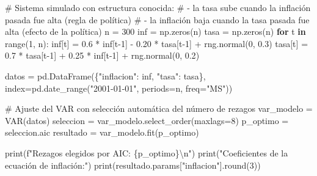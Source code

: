 \documentclass[
  spanish,
  letterpaper,
  DIV=11,
  numbers=noendperiod]{scrreprt}
\newenvironment{Shaded}{\begin{snugshade}}{\end{snugshade}}
\newcommand{\BuiltInTok}[1]{\textcolor[rgb]{0.00,0.23,0.31}{#1}}
\newcommand{\CharTok}[1]{\textcolor[rgb]{0.13,0.47,0.30}{#1}}
\newcommand{\CommentTok}[1]{\textcolor[rgb]{0.37,0.37,0.37}{#1}}
\newcommand{\ControlFlowTok}[1]{\textcolor[rgb]{0.00,0.23,0.31}{\textbf{#1}}}
\newcommand{\DecValTok}[1]{\textcolor[rgb]{0.68,0.00,0.00}{#1}}
\newcommand{\FloatTok}[1]{\textcolor[rgb]{0.68,0.00,0.00}{#1}}
\newcommand{\KeywordTok}[1]{\textcolor[rgb]{0.00,0.23,0.31}{\textbf{#1}}}
\newcommand{\NormalTok}[1]{\textcolor[rgb]{0.00,0.23,0.31}{#1}}
\newcommand{\OperatorTok}[1]{\textcolor[rgb]{0.37,0.37,0.37}{#1}}
\newcommand{\SpecialCharTok}[1]{\textcolor[rgb]{0.37,0.37,0.37}{#1}}
\newcommand{\SpecialStringTok}[1]{\textcolor[rgb]{0.13,0.47,0.30}{#1}}
\newcommand{\StringTok}[1]{\textcolor[rgb]{0.13,0.47,0.30}{#1}}
\begin{document}
\label{var-datos}
\begin{Shaded}
\begin{Highlighting}[]
\CommentTok{\# Sistema simulado con estructura conocida:}
\CommentTok{\#   {-} la tasa sube cuando la inflación pasada fue alta (regla de política)}
\CommentTok{\#   {-} la inflación baja cuando la tasa pasada fue alta (efecto de la política)}
\NormalTok{n }\OperatorTok{=} \DecValTok{300}
\NormalTok{inf }\OperatorTok{=}\NormalTok{ np.zeros(n)}
\NormalTok{tasa }\OperatorTok{=}\NormalTok{ np.zeros(n)}
\ControlFlowTok{for}\NormalTok{ t }\KeywordTok{in} \BuiltInTok{range}\NormalTok{(}\DecValTok{1}\NormalTok{, n):}
\NormalTok{    inf[t] }\OperatorTok{=} \FloatTok{0.6} \OperatorTok{*}\NormalTok{ inf[t}\OperatorTok{{-}}\DecValTok{1}\NormalTok{] }\OperatorTok{{-}} \FloatTok{0.20} \OperatorTok{*}\NormalTok{ tasa[t}\OperatorTok{{-}}\DecValTok{1}\NormalTok{] }\OperatorTok{+}\NormalTok{ rng.normal(}\DecValTok{0}\NormalTok{, }\FloatTok{0.3}\NormalTok{)}
\NormalTok{    tasa[t] }\OperatorTok{=} \FloatTok{0.7} \OperatorTok{*}\NormalTok{ tasa[t}\OperatorTok{{-}}\DecValTok{1}\NormalTok{] }\OperatorTok{+} \FloatTok{0.25} \OperatorTok{*}\NormalTok{ inf[t}\OperatorTok{{-}}\DecValTok{1}\NormalTok{] }\OperatorTok{+}\NormalTok{ rng.normal(}\DecValTok{0}\NormalTok{, }\FloatTok{0.2}\NormalTok{)}

\NormalTok{datos }\OperatorTok{=}\NormalTok{ pd.DataFrame(\{}\StringTok{"inflacion"}\NormalTok{: inf, }\StringTok{"tasa"}\NormalTok{: tasa\},}
\NormalTok{                     index}\OperatorTok{=}\NormalTok{pd.date\_range(}\StringTok{"2001{-}01{-}01"}\NormalTok{, periods}\OperatorTok{=}\NormalTok{n, freq}\OperatorTok{=}\StringTok{"MS"}\NormalTok{))}

\CommentTok{\# Ajuste del VAR con selección automática del número de rezagos}
\NormalTok{var\_modelo }\OperatorTok{=}\NormalTok{ VAR(datos)}
\NormalTok{seleccion }\OperatorTok{=}\NormalTok{ var\_modelo.select\_order(maxlags}\OperatorTok{=}\DecValTok{8}\NormalTok{)}
\NormalTok{p\_optimo }\OperatorTok{=}\NormalTok{ seleccion.aic}
\NormalTok{resultado }\OperatorTok{=}\NormalTok{ var\_modelo.fit(p\_optimo)}

\BuiltInTok{print}\NormalTok{(}\SpecialStringTok{f"Rezagos elegidos por AIC: }\SpecialCharTok{\{}\NormalTok{p\_optimo}\SpecialCharTok{\}}\CharTok{\textbackslash{}n}\SpecialStringTok{"}\NormalTok{)}
\BuiltInTok{print}\NormalTok{(}\StringTok{"Coeficientes de la ecuación de inflación:"}\NormalTok{)}
\BuiltInTok{print}\NormalTok{(resultado.params[}\StringTok{"inflacion"}\NormalTok{].}\BuiltInTok{round}\NormalTok{(}\DecValTok{3}\NormalTok{))}
\end{Highlighting}
\end{Shaded}
\end{document}
